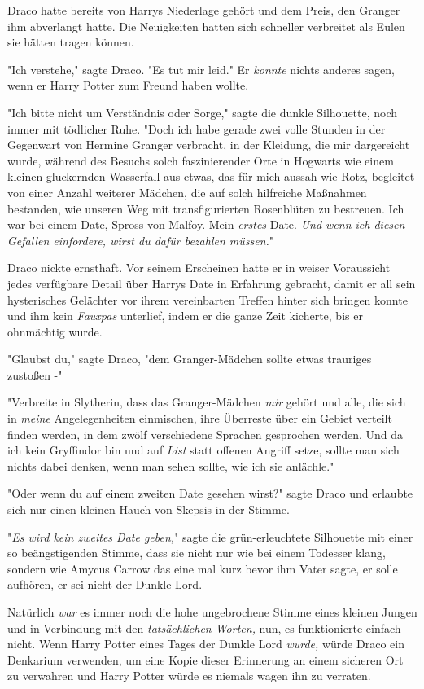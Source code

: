 {Draco hatte bereits von Harrys Niederlage gehört und dem Preis, den Granger ihm abverlangt hatte. Die Neuigkeiten hatten sich schneller verbreitet als Eulen sie hätten tragen können.

"Ich verstehe," sagte Draco. "Es tut mir leid." Er \emph{konnte} nichts anderes sagen, wenn er Harry Potter zum Freund haben wollte.

"Ich bitte nicht um Verständnis oder Sorge," sagte die dunkle Silhouette, noch immer mit tödlicher Ruhe. "Doch ich habe gerade zwei volle Stunden in der Gegenwart von Hermine Granger verbracht, in der Kleidung, die mir dargereicht wurde, während des Besuchs solch faszinierender Orte in Hogwarts wie einem kleinen gluckernden Wasserfall aus etwas, das für mich aussah wie Rotz, begleitet von einer Anzahl weiterer Mädchen, die auf solch hilfreiche Maßnahmen bestanden, wie unseren Weg mit transfigurierten Rosenblüten zu bestreuen. Ich war bei einem Date, Spross von Malfoy. Mein \emph{erstes} Date. \emph{Und wenn ich diesen Gefallen einfordere, wirst du dafür bezahlen müssen.}"

Draco nickte ernsthaft. Vor seinem Erscheinen hatte er in weiser Voraussicht jedes verfügbare Detail über Harrys Date in Erfahrung gebracht, damit er all sein hysterisches Gelächter vor ihrem vereinbarten Treffen hinter sich bringen konnte und ihm kein \emph{Fauxpas} unterlief, indem er die ganze Zeit kicherte, bis er ohnmächtig wurde.

"Glaubst du," sagte Draco, "dem Granger-Mädchen sollte etwas trauriges zustoßen -"

"Verbreite in Slytherin, dass das Granger-Mädchen \emph{mir} gehört und alle, die sich in \emph{meine} Angelegenheiten einmischen, ihre Überreste über ein Gebiet verteilt finden werden, in dem zwölf verschiedene Sprachen gesprochen werden. Und da ich kein Gryffindor bin und auf \emph{List} statt offenen Angriff setze, sollte man sich nichts dabei denken, wenn man sehen sollte, wie ich sie anlächle."

"Oder wenn du auf einem zweiten Date gesehen wirst?" sagte Draco und erlaubte sich nur einen kleinen Hauch von Skepsis in der Stimme.

"\emph{Es wird kein zweites Date geben,}" sagte die grün-erleuchtete Silhouette mit einer so beängstigenden Stimme, dass sie nicht nur wie bei einem Todesser klang, sondern wie Amycus Carrow das eine mal kurz bevor ihm Vater sagte, er solle aufhören, er sei nicht der Dunkle Lord.

Natürlich \emph{war} es immer noch die hohe ungebrochene Stimme eines kleinen Jungen und in Verbindung mit den \emph{tatsächlichen Worten,} nun, es funktionierte einfach nicht. Wenn Harry Potter eines Tages der Dunkle Lord \emph{wurde,} würde Draco ein Denkarium verwenden, um eine Kopie dieser Erinnerung an einem sicheren Ort zu verwahren und Harry Potter würde es niemals wagen ihn zu verraten.

}
